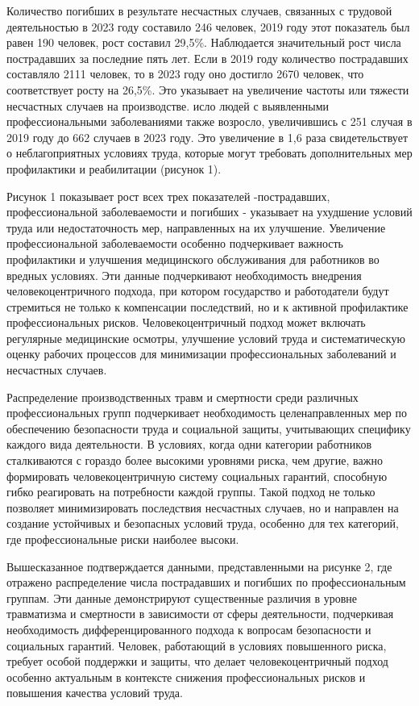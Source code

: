 \begin{multicols}{2}


  Количество погибших в результате несчастных случаев, связанных с
  трудовой деятельностью в 2023 году составило 246 человек, 2019 году этот
  показатель был равен 190 человек, рост составил 29,5\%. Наблюдается
  значительный рост числа пострадавших за последние пять лет. Если в 2019
  году количество пострадавших составляло 2111 человек, то в 2023 году оно
  достигло 2670 человек, что соответствует росту на 26,5\%. Это указывает
  на увеличение частоты или тяжести несчастных случаев на производстве.
  исло людей с выявленными профессиональными заболеваниями также возросло,
  увеличившись с 251 случая в 2019 году до 662 случаев в 2023 году. Это
  увеличение в 1,6 раза свидетельствует о неблагоприятных условиях труда,
  которые могут требовать дополнительных мер профилактики и реабилитации
  (рисунок 1).

Рисунок 1 показывает рост всех трех показателей -пострадавших,
профессиональной заболеваемости и погибших - указывает на ухудшение
условий труда или недостаточность мер, направленных на их улучшение.
Увеличение профессиональной заболеваемости особенно подчеркивает
важность профилактики и улучшения медицинского обслуживания для
работников во вредных условиях. Эти данные подчеркивают необходимость
внедрения человекоцентричного подхода, при котором государство и
работодатели будут стремиться не только к компенсации последствий, но и
к активной профилактике профессиональных рисков. Человекоцентричный
подход может включать регулярные медицинские осмотры, улучшение условий
труда и систематическую оценку рабочих процессов для минимизации
профессиональных заболеваний и несчастных случаев.

Распределение производственных травм и смертности среди различных
профессиональных групп подчеркивает необходимость целенаправленных мер
по обеспечению безопасности труда и социальной защиты, учитывающих
специфику каждого вида деятельности. В условиях, когда одни категории
работников сталкиваются с гораздо более высокими уровнями риска, чем
другие, важно формировать человекоцентричную систему социальных
гарантий, способную гибко реагировать на потребности каждой группы.
Такой подход не только позволяет минимизировать последствия несчастных
случаев, но и направлен на создание устойчивых и безопасных условий
труда, особенно для тех категорий, где профессиональные риски наиболее
высоки.

Вышесказанное подтверждается данными, представленными на рисунке 2, где
отражено распределение числа пострадавших и погибших по профессиональным
группам. Эти данные демонстрируют существенные различия в уровне
травматизма и смертности в зависимости от сферы деятельности,
подчеркивая необходимость дифференцированного подхода к вопросам
безопасности и социальных гарантий. Человек, работающий в условиях
повышенного риска, требует особой поддержки и защиты, что делает
человекоцентричный подход особенно актуальным в контексте снижения
профессиональных рисков и повышения качества условий труда.


\end{multicols}
